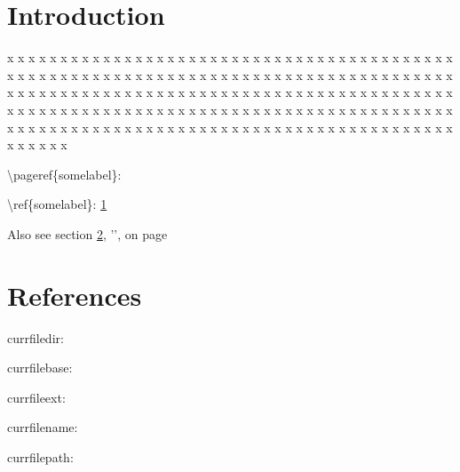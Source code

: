 \documentclass[a5paper]{article}
\begin{document}
\linenumbers

\clearpage\mbox{}\clearpage

\section{Introduction}
\label{somelabel}
\lipsum[1]


\auxgeo



x x x x x x x x x x x x x x x x x x x x x x x x x x x x x x x x x x x x x x x x x x x x x x x x x x x x x x
x x x x x x x x x x x x x x x x x x x x x x x x x x x x x x x x x x x x x x x x x x x x x x x x x x x x x x
x x x x x x x x x x x x x x x x x x x x x x x x x x x x x x x x x x x x x x x x x x x x x x x x x x x x x x
x x x x x x x x x x x x x x x x x x x x x x x x x x x x x x x x x x x x x x x x x x x x x x x x x x x x x x

\textbackslash{}pageref\{somelabel\}: \pageref{somelabel}

\textbackslash{}ref\{somelabel\}: \ref{somelabel}

Also see section \ref{otherlabel}, '', on page \pageref{otherlabel}

\currfilename

\clearpage
\section{References}
\label{otherlabel}


currfiledir: \currfiledir

currfilebase: \currfilebase

currfileext: \currfileext

currfilename: \currfilename

currfilepath: \currfilepath

\jobname

\end{document}
